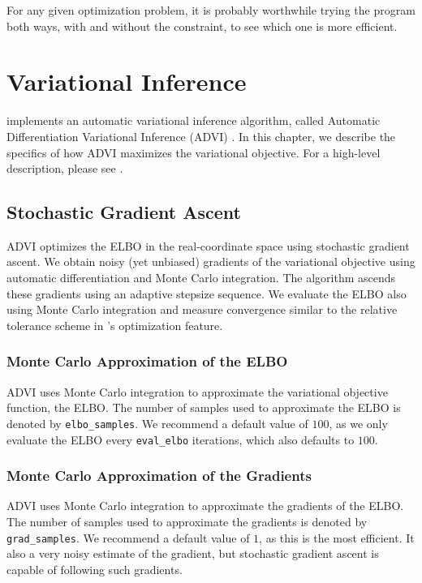 For any given optimization problem, it is probably worthwhile trying
the program both ways, with and without the constraint, to see which
one is more efficient.


\chapter{Variational Inference}\label{vi-algorithms.chapter}

\noindent
\Stan implements an automatic variational inference algorithm, called
Automatic Differentiation Variational Inference (ADVI)
\citep{Kucukelbir:2015}. In this chapter, we describe the specifics of
how ADVI maximizes the variational objective. For a high-level
description, please see .

\section{Stochastic Gradient Ascent}

ADVI optimizes the ELBO in the real-coordinate space using stochastic
gradient ascent. We obtain noisy (yet unbiased) gradients of the
variational objective using automatic differentiation and Monte Carlo
integration. The algorithm ascends these gradients using an adaptive
stepsize sequence. We evaluate the ELBO also using Monte Carlo
integration and measure convergence similar to the relative tolerance
scheme in \Stan's optimization feature.

\subsection{Monte Carlo Approximation of the ELBO}

ADVI uses Monte Carlo integration to approximate the variational
objective function, the ELBO. The number of samples used to
approximate the ELBO is denoted by \texttt{elbo\_samples}. We
recommend a default value of $100$, as we only evaluate the ELBO every
\texttt{eval\_elbo} iterations, which also defaults to $100$.

\subsection{Monte Carlo Approximation of the Gradients}

ADVI uses Monte Carlo integration to approximate the gradients of the
ELBO. The number of samples used to approximate the gradients is
denoted by \texttt{grad\_samples}. We recommend a default value of
$1$, as this is the most efficient. It also a very noisy estimate of
the gradient, but stochastic gradient ascent is capable of following
such gradients.

